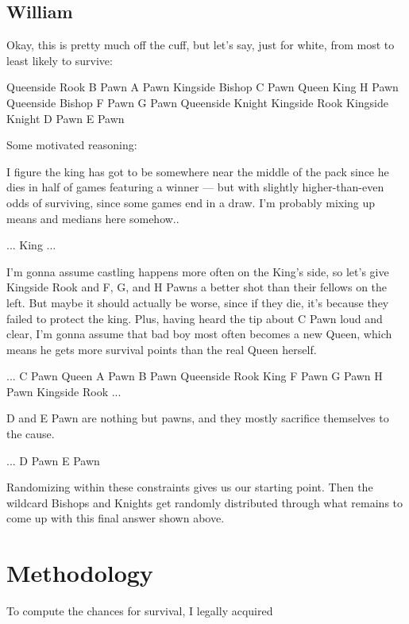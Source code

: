 \documentclass[twocolumn]{article}
\begin{document}
\subsection{William}

Okay, this is pretty much off the cuff, but let’s say, just for white,
from most to least likely to survive:

Queenside Rook
B Pawn
A Pawn
Kingside Bishop
C Pawn
Queen
King
H Pawn
Queenside Bishop
F Pawn
G Pawn
Queenside Knight
Kingside Rook
Kingside Knight
D Pawn
E Pawn

Some motivated reasoning:

I figure the king has got to be somewhere near the middle of the pack
since he dies in half of games featuring a winner — but with slightly
higher-than-even odds of surviving, since some games end in a draw.
I’m probably mixing up means and medians here somehow..

...
King
...

I’m gonna assume castling happens more often on the King’s side, so
let’s give Kingside Rook and F, G, and H Pawns a better shot than
their fellows on the left. But maybe it should actually be worse,
since if they die, it’s because they failed to protect the king. Plus,
having heard the tip about C Pawn loud and clear, I’m gonna assume
that bad boy most often becomes a new Queen, which means he gets more
survival points than the real Queen herself.

...
C Pawn
Queen
A Pawn
B Pawn
Queenside Rook
King
F Pawn
G Pawn
H Pawn
Kingside Rook
...

D and E Pawn are nothing but pawns, and they mostly sacrifice
themselves to the cause.

...
D Pawn
E Pawn

Randomizing within these constraints gives us our starting point. Then
the wildcard Bishops and Knights get randomly distributed through what
remains to come up with this final answer shown above.

\section{Methodology}

To compute the chances for survival, I legally acquired 



\nocite{chesstego}

{}

\end{document}
